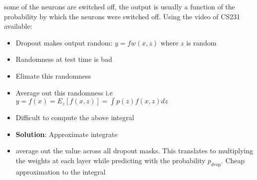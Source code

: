 \documentclass[a4paper]{article}
\begin{document}
\begin{itemize}
\begin{itemize}
                some of the neurons are switched off, the output is usually a function of the probability by which the neurons were switched off. Using the video of CS231 available:
                \begin{itemize}
                    \item Dropout makes output random: $y = fw(x, z)$ where $z$ is random
                    \item Randomness at test time is bad
                    \item Elimate this randomness
                    \item Average out this randomness i.e $y = f(x) = E_{z}[f(x,z)] = \int p(z) f(x,z)dz$
                    \item Difficult to compute the above integral
                    \item \textbf{Solution}: Approximate integrate 
                    \item average out the value across all dropout masks. This translates to multiplying the weights at each layer while predicting with the probability $p_{drop}$. Cheap approximation to the integral
                \end{itemize}
        \end{itemize}
\end{itemize}
\end{document}
